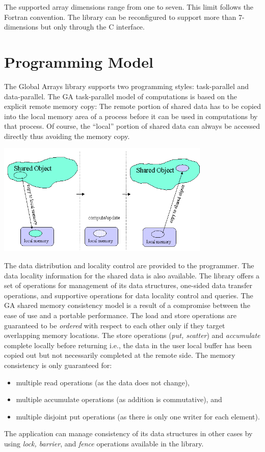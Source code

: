 The supported array dimensions range from one to seven. This limit follows the
Fortran convention. The library can be reconfigured to support more than
7-dimensions but only through the C interface. 

\section{Programming Model}

The Global Arrays library supports two programming styles: task-parallel and
data-parallel. The GA task-parallel model of computations is based on the
explicit remote memory copy: The remote portion of shared data has to be copied
into the local memory area of a process before it can be used in computations
by that process. Of course, the ``local'' portion of shared data can always be
accessed directly thus avoiding the memory copy. 

\includegraphics[width=4in]{mod}

The data distribution and locality control are provided to the programmer.  The
data locality information for the shared data is also available.  The library
offers a set of operations for management of its data structures, one-sided
data transfer operations, and supportive operations for data locality control
and queries. The GA shared memory consistency model is a result of a compromise
between the ease of use and a portable performance. The load and store
operations are guaranteed to be \emph{ordered} with respect to each other only
if they target overlapping memory locations. The store operations (\emph{put,
scatter}) and \emph{accumulate} complete locally before returning i.e., the
data in the user local buffer has been copied out but not necessarily completed
at the remote side. The memory consistency is only guaranteed for: 
\begin{itemize}
\item multiple read operations (as the data does not change), 
\item multiple accumulate operations (as addition is commutative), and 
\item multiple disjoint put operations (as there is only one writer for each
element). 
\end{itemize}
The application can manage consistency of its data structures in other cases by
using \emph{lock, barrier}, and \emph{fence} operations available in the
library. 

